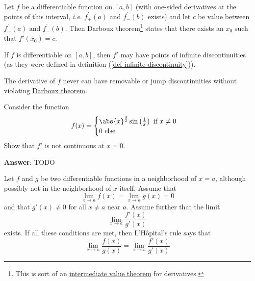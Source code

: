\begin{thm}\label{thm-darboux-theorem}
	Let $f$ be a differentiable function on $[a,b]$ (with one-sided derivatives
	at the points of this interval, \textit{i.e.} $f_+^\prime(a)$ and $f_-^\prime(b)$
	exists) and let $c$ be value between $f_+^\prime(a)$ and $f_-^\prime(b)$.
	Then Darboux theorem\footnote{This is sort of an
		\hyperref[thm-intermediate-value-theorem]{intermediate value theorem}
		for derivatives.} states that there exists an $x_0$ such that $f'(x_0)=c$.
\end{thm}

\begin{crl}\label{crl-darboux-theorem}
	If $f$ is differentiable on $[a,b]$, then $f'$ may have points of infinite
	discontinuities (as they were defined in definition (\ref{def-infinite-discontinuity})).
\end{crl}

\begin{rem}\label{rem-darboux-theorem}
	The derivative of $f$ never can have removable or jump discontinuities without
	violating \hyperref[thm-darboux-theorem]{Darboux theorem}.
\end{rem}

\begin{exm}
	Consider the function
	\begin{equation*}
		f(x)=\begin{cases}
			\abs{x}^\frac{3}{2}\sin\left(\frac{1}{x}\right)\text{ if }x\neq0 \\
			0\text{ else }
		\end{cases}
	\end{equation*}
	Show that $f'$ is not continuous at $x=0$.
	\begin{flushleft}
		\textbf{Answer}: TODO
	\end{flushleft}
\end{exm}

\begin{thm}\label{thm-lhopitals-rule}
	Let $f$ and $g$ be two differentiable functions in a neighborhood of $x=a$,
	although possibly not in the neighborhood of $x$ itself. Assume that
	\begin{equation*}
		\lim_{x \to a}f(x)=\lim_{x \to a}g(x)=0
	\end{equation*}
	and that $g'(x)\neq0$ for all $x \neq a$ near $a$. Assume further that the limit
	\begin{equation*}
		\lim_{x \to a}\frac{f'(x)}{g'(x)}
	\end{equation*}
	exists. If all these conditions are met, then L'H{\^o}pital's rule says that
	\begin{equation}
		\lim_{x \to a}\frac{f(x)}{g(x)}=\lim_{x \to a}\frac{f'(x)}{g'(x)}
	\end{equation}
\end{thm}

